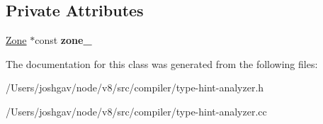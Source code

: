 \subsection*{Private Attributes}
\begin{DoxyCompactItemize}
\item 
\hyperlink{classv8_1_1internal_1_1_zone}{Zone} $\ast$const {\bfseries zone\+\_\+}\hypertarget{classv8_1_1internal_1_1compiler_1_1_type_hint_analyzer_a21e4b67f69f6736ca123b3bf1aec31be}{}\label{classv8_1_1internal_1_1compiler_1_1_type_hint_analyzer_a21e4b67f69f6736ca123b3bf1aec31be}

\end{DoxyCompactItemize}


The documentation for this class was generated from the following files\+:\begin{DoxyCompactItemize}
\item 
/\+Users/joshgav/node/v8/src/compiler/type-\/hint-\/analyzer.\+h\item 
/\+Users/joshgav/node/v8/src/compiler/type-\/hint-\/analyzer.\+cc\end{DoxyCompactItemize}
